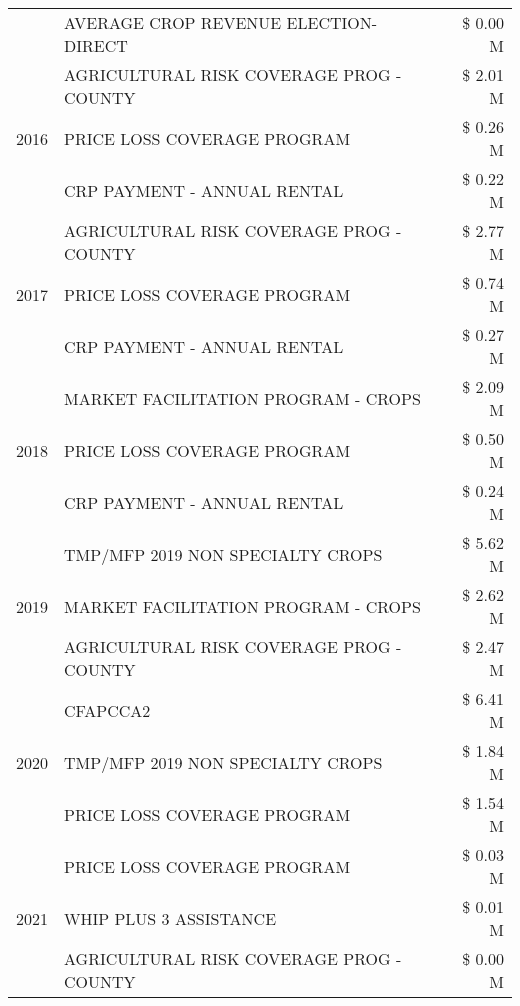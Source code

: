\begin{tabular}{llr}
 & AVERAGE CROP REVENUE ELECTION-DIRECT & \$ 0.00 M \\
\cline{1-3}
\multirow[t]{3}{*}{2016} & AGRICULTURAL RISK COVERAGE PROG - COUNTY      & \$ 2.01 M \\
 & PRICE LOSS COVERAGE PROGRAM                   & \$ 0.26 M \\
 & CRP PAYMENT - ANNUAL RENTAL                   & \$ 0.22 M \\
\cline{1-3}
\multirow[t]{3}{*}{2017} & AGRICULTURAL RISK COVERAGE PROG - COUNTY & \$ 2.77 M \\
 & PRICE LOSS COVERAGE PROGRAM & \$ 0.74 M \\
 & CRP PAYMENT - ANNUAL RENTAL & \$ 0.27 M \\
\cline{1-3}
\multirow[t]{3}{*}{2018} & MARKET FACILITATION PROGRAM - CROPS & \$ 2.09 M \\
 & PRICE LOSS COVERAGE PROGRAM & \$ 0.50 M \\
 & CRP PAYMENT - ANNUAL RENTAL & \$ 0.24 M \\
\cline{1-3}
\multirow[t]{3}{*}{2019} & TMP/MFP 2019 NON SPECIALTY CROPS & \$ 5.62 M \\
 & MARKET FACILITATION PROGRAM - CROPS & \$ 2.62 M \\
 & AGRICULTURAL RISK COVERAGE PROG - COUNTY & \$ 2.47 M \\
\cline{1-3}
\multirow[t]{3}{*}{2020} & CFAPCCA2 & \$ 6.41 M \\
 & TMP/MFP 2019 NON SPECIALTY CROPS & \$ 1.84 M \\
 & PRICE LOSS COVERAGE PROGRAM & \$ 1.54 M \\
\cline{1-3}
\multirow[t]{3}{*}{2021} & PRICE LOSS COVERAGE PROGRAM & \$ 0.03 M \\
 & WHIP PLUS 3 ASSISTANCE & \$ 0.01 M \\
 & AGRICULTURAL RISK COVERAGE PROG - COUNTY & \$ 0.00 M \\
\cline{1-3}
\bottomrule
\end{tabular}
